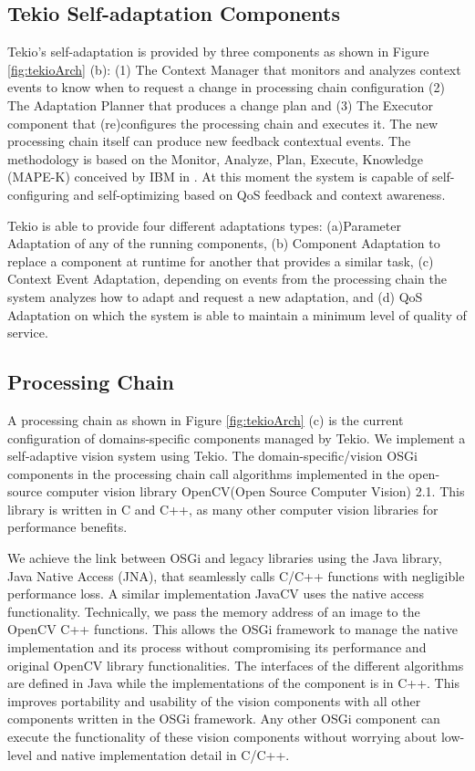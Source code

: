 \documentclass{acm_proc_article-sp}
\begin{document}
\subsection{Tekio Self-adaptation Components} 
\label{sec:sec:selfTekio}

Tekio's self-adaptation is provided by three components as shown in Figure \ref{fig:tekioArch} (b):  (1) The Context Manager that monitors and analyzes context events to know when to request a change in processing chain configuration (2) The Adaptation Planner that produces a change plan and (3) The Executor component that (re)configures the processing chain  and executes it. The new processing chain itself can produce new feedback contextual events. The methodology is based on  the Monitor, Analyze, Plan, Execute, Knowledge (MAPE-K) conceived by IBM in \cite{IBM2005}. At this moment the system is capable of self-configuring and self-optimizing based on QoS feedback and context awareness. 

Tekio is able to provide four different adaptations types: (a)Parameter Adaptation of any of the running components, (b) Component Adaptation to replace a component at runtime for another that provides a similar task, (c) Context Event Adaptation, depending on events from the  processing chain the system analyzes how to adapt and request a new adaptation, and (d) QoS Adaptation on which the system is able to maintain a minimum level of quality of service. 

\subsection{Processing Chain}
\label{sec:sec:chainTekio}

A processing chain as shown in Figure \ref{fig:tekioArch} (c)  is the current configuration of domains-specific components managed by Tekio. We implement a self-adaptive vision system using Tekio. The domain-specific/vision OSGi components in the processing chain call algorithms implemented in the open-source computer vision library OpenCV(Open Source Computer Vision) 2.1. This library is written in C and C++, as many other computer vision libraries for performance benefits. 

We achieve the link between OSGi and legacy libraries using the Java library, Java Native Access (JNA), that seamlessly calls C/C++ functions with negligible performance loss. 
A similar implementation  JavaCV \cite{javacv} uses the native access functionality. Technically,  we pass the memory address of an image to the OpenCV C++ functions. This allows  the OSGi framework to manage the native implementation and its process without compromising its performance and original OpenCV library functionalities. The interfaces of the different algorithms are defined in Java while the implementations of the component is in C++. This improves portability and usability of the vision components with  all other components written in the OSGi framework. Any other OSGi component can execute the functionality of these vision components without worrying about low-level and native implementation detail in C/C++.
\end{document}
